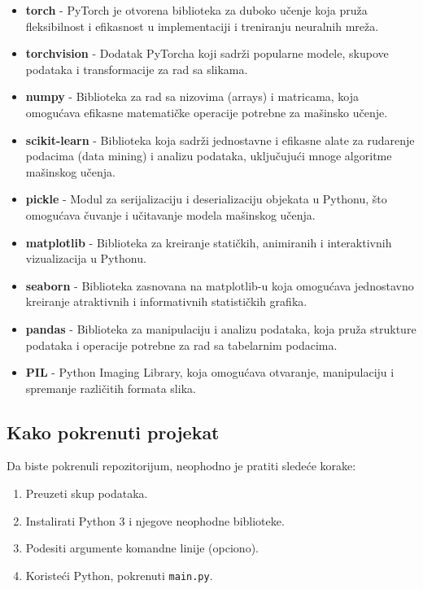 \documentclass{article}
\begin{document}
\begin{itemize}
    \item \textbf{torch} - PyTorch je otvorena biblioteka za duboko učenje koja pruža fleksibilnost i efikasnost u implementaciji i treniranju neuralnih mreža.
    \item \textbf{torchvision} - Dodatak PyTorcha koji sadrži popularne modele, skupove podataka i transformacije za rad sa slikama.
    \item \textbf{numpy} - Biblioteka za rad sa nizovima (arrays) i matricama, koja omogućava efikasne matematičke operacije potrebne za mašinsko učenje.
    \item \textbf{scikit-learn} - Biblioteka koja sadrži jednostavne i efikasne alate za rudarenje podacima (data mining) i analizu podataka, uključujući mnoge algoritme mašinskog učenja.
    \item \textbf{pickle} - Modul za serijalizaciju i deserializaciju objekata u Pythonu, što omogućava čuvanje i učitavanje modela mašinskog učenja.
    \item \textbf{matplotlib} - Biblioteka za kreiranje statičkih, animiranih i interaktivnih vizualizacija u Pythonu.
    \item \textbf{seaborn} - Biblioteka zasnovana na matplotlib-u koja omogućava jednostavno kreiranje atraktivnih i informativnih statističkih grafika.
    \item \textbf{pandas} - Biblioteka za manipulaciju i analizu podataka, koja pruža strukture podataka i operacije potrebne za rad sa tabelarnim podacima.
    \item \textbf{PIL} - Python Imaging Library, koja omogućava otvaranje, manipulaciju i spremanje različitih formata slika.
\end{itemize}

\subsection{Kako pokrenuti projekat}

Da biste pokrenuli repozitorijum, neophodno je pratiti sledeće korake:

\begin{enumerate}
    \item Preuzeti skup podataka.
    \item Instalirati Python 3 i njegove neophodne biblioteke.
    \item Podesiti argumente komandne linije (opciono).
    \item Koristeći Python, pokrenuti \texttt{main.py}.
\end{enumerate}
\end{document}
